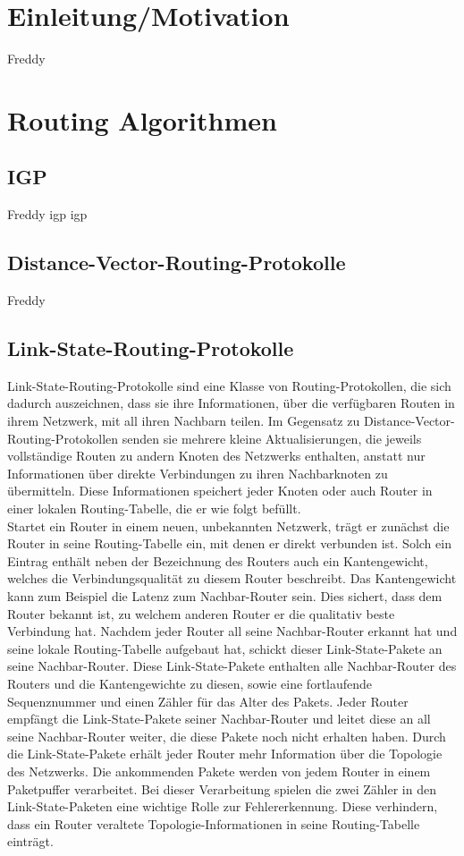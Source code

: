 \documentclass[1pt,a4paper,final]{article}
\begin{document}
\section{Einleitung/Motivation}
Freddy
\section{Routing Algorithmen}
\subsection{IGP}
Freddy
\ac{igp} \ac{igp}
\subsection{Distance-Vector-Routing-Protokolle}
Freddy
\subsection{Link-State-Routing-Protokolle}
Link-State-Routing-Protokolle sind eine Klasse von Routing-Protokollen, die sich dadurch auszeichnen, dass sie ihre Informationen, über die verfügbaren Routen in ihrem Netzwerk, mit all ihren Nachbarn teilen. Im Gegensatz zu Distance-Vector-Routing-Protokollen senden sie mehrere kleine Aktualisierungen, die jeweils vollständige Routen zu andern Knoten des Netzwerks enthalten, anstatt nur Informationen über direkte Verbindungen zu ihren Nachbarknoten zu übermitteln.
Diese Informationen speichert jeder Knoten oder auch Router in einer lokalen Routing-Tabelle, die er wie folgt befüllt.\\
Startet ein Router in einem neuen, unbekannten Netzwerk, trägt er zunächst die Router in seine Routing-Tabelle ein, mit denen er direkt verbunden ist. Solch ein Eintrag enthält neben der Bezeichnung des Routers auch ein Kantengewicht, welches die Verbindungsqualität zu diesem Router beschreibt. Das Kantengewicht kann zum Beispiel die Latenz zum Nachbar-Router sein. Dies sichert, dass dem Router bekannt ist, zu welchem anderen Router er die qualitativ beste Verbindung hat. Nachdem jeder Router all seine Nachbar-Router erkannt hat und seine lokale Routing-Tabelle aufgebaut hat, schickt dieser Link-State-Pakete an seine Nachbar-Router. Diese Link-State-Pakete enthalten alle Nachbar-Router des Routers und die Kantengewichte zu diesen, sowie eine fortlaufende Sequenznummer und einen Zähler für das Alter des Pakets. Jeder Router empfängt die Link-State-Pakete seiner Nachbar-Router und leitet diese an all seine Nachbar-Router weiter, die diese Pakete noch nicht erhalten haben. Durch die Link-State-Pakete erhält jeder Router mehr Information über die Topologie des Netzwerks. Die ankommenden Pakete werden von jedem Router in einem Paketpuffer verarbeitet. Bei dieser Verarbeitung spielen die zwei Zähler in den Link-State-Paketen eine wichtige Rolle zur Fehlererkennung. Diese verhindern, dass ein Router veraltete Topologie-Informationen in seine Routing-Tabelle einträgt.
\end{document}
